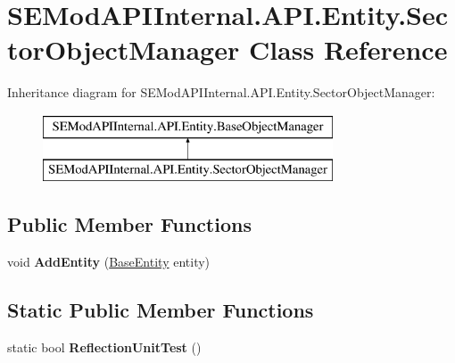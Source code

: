 \hypertarget{class_s_e_mod_a_p_i_internal_1_1_a_p_i_1_1_entity_1_1_sector_object_manager}{}\section{S\+E\+Mod\+A\+P\+I\+Internal.\+A\+P\+I.\+Entity.\+Sector\+Object\+Manager Class Reference}
\label{class_s_e_mod_a_p_i_internal_1_1_a_p_i_1_1_entity_1_1_sector_object_manager}
Inheritance diagram for S\+E\+Mod\+A\+P\+I\+Internal.\+A\+P\+I.\+Entity.\+Sector\+Object\+Manager\+:\begin{figure}[H]
\begin{center}
\leavevmode
\includegraphics[height=2.000000cm]{class_s_e_mod_a_p_i_internal_1_1_a_p_i_1_1_entity_1_1_sector_object_manager}
\end{center}
\end{figure}
\subsection*{Public Member Functions}
\begin{DoxyCompactItemize}
\item 
\hypertarget{class_s_e_mod_a_p_i_internal_1_1_a_p_i_1_1_entity_1_1_sector_object_manager_a4e08e0b2ca4e59ec79f71865f988a229}{}void {\bfseries Add\+Entity} (\hyperlink{class_s_e_mod_a_p_i_internal_1_1_a_p_i_1_1_entity_1_1_base_entity}{Base\+Entity} entity)\label{class_s_e_mod_a_p_i_internal_1_1_a_p_i_1_1_entity_1_1_sector_object_manager_a4e08e0b2ca4e59ec79f71865f988a229}

\end{DoxyCompactItemize}
\subsection*{Static Public Member Functions}
\begin{DoxyCompactItemize}
\item 
\hypertarget{class_s_e_mod_a_p_i_internal_1_1_a_p_i_1_1_entity_1_1_sector_object_manager_a7363761477f06589ae8f2b9efbc6418b}{}static bool {\bfseries Reflection\+Unit\+Test} ()\label{class_s_e_mod_a_p_i_internal_1_1_a_p_i_1_1_entity_1_1_sector_object_manager_a7363761477f06589ae8f2b9efbc6418b}

\end{DoxyCompactItemize}
